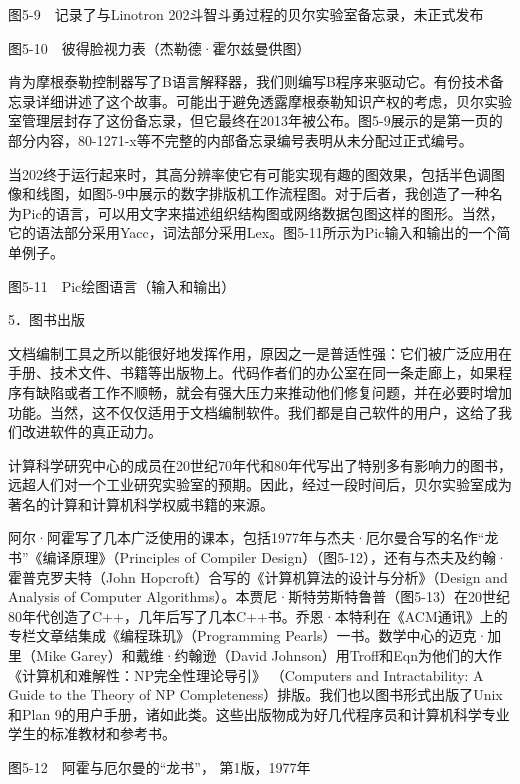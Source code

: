 \documentclass[a4paper,12pt,UTF8,twoside]{ctexbook}
\begin{document}
{{图5-9　记录了与Linotron 202斗智斗勇过程的贝尔实验室备忘录，未正式发布



图5-10　彼得脸视力表（杰勒德·霍尔兹曼供图）

肯为摩根泰勒控制器写了B语言解释器，我们则编写B程序来驱动它。有份技术备忘录详细讲述了这个故事。可能出于避免透露摩根泰勒知识产权的考虑，贝尔实验室管理层封存了这份备忘录，但它最终在2013年被公布。图5-9展示的是第一页的部分内容，80-1271-x等不完整的内部备忘录编号表明从未分配过正式编号。

当202终于运行起来时，其高分辨率使它有可能实现有趣的图效果，包括半色调图像和线图，如图5-9中展示的数字排版机工作流程图。对于后者，我创造了一种名为Pic的语言，可以用文字来描述组织结构图或网络数据包图这样的图形。当然，它的语法部分采用Yacc，词法部分采用Lex。图5-11所示为Pic输入和输出的一个简单例子。



图5-11　Pic绘图语言（输入和输出）





5．图书出版


文档编制工具之所以能很好地发挥作用，原因之一是普适性强：它们被广泛应用在手册、技术文件、书籍等出版物上。代码作者们的办公室在同一条走廊上，如果程序有缺陷或者工作不顺畅，就会有强大压力来推动他们修复问题，并在必要时增加功能。当然，这不仅仅适用于文档编制软件。我们都是自己软件的用户，这给了我们改进软件的真正动力。

计算科学研究中心的成员在20世纪70年代和80年代写出了特别多有影响力的图书，远超人们对一个工业研究实验室的预期。因此，经过一段时间后，贝尔实验室成为著名的计算和计算机科学权威书籍的来源。

阿尔·阿霍写了几本广泛使用的课本，包括1977年与杰夫·厄尔曼合写的名作“龙书”《编译原理》（Principles of Compiler Design）（图5-12），还有与杰夫及约翰·霍普克罗夫特（John Hopcroft）合写的《计算机算法的设计与分析》（Design and Analysis of Computer Algorithms）。本贾尼·斯特劳斯特鲁普（图5-13）在20世纪80年代创造了C++，几年后写了几本C++书。乔恩·本特利在《ACM通讯》上的专栏文章结集成《编程珠玑》（Programming Pearls）一书。数学中心的迈克·加里（Mike Garey）和戴维·约翰逊（David Johnson）用Troff和Eqn为他们的大作《计算机和难解性：NP完全性理论导引》 （Computers and Intractability: A Guide to the Theory of NP Completeness）排版。我们也以图书形式出版了Unix 和Plan 9的用户手册，诸如此类。这些出版物成为好几代程序员和计算机科学专业学生的标准教材和参考书。



图5-12　阿霍与厄尔曼的“龙书”， 第1版，1977年



}}
\end{document}
